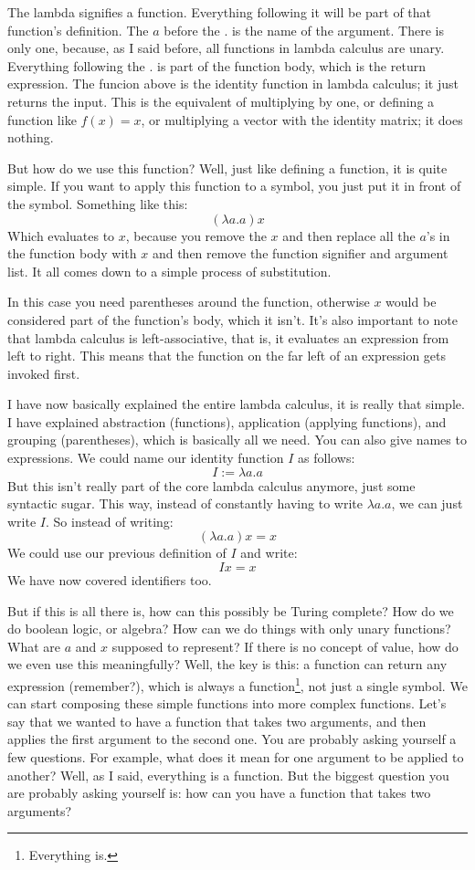 \documentclass[11pt]{article}
\begin{document}
The lambda signifies a function. Everything following it will be part of that
function's definition. The \(a\) before the \(.\) is the name of the argument.
There is only one, because, as I said before, all functions in lambda calculus
are unary. Everything following the \(.\) is part of the function body, which
is the return expression. The funcion above is the identity function in lambda
calculus; it just returns the input. This is the equivalent of multiplying by
one, or defining a function like \(f(x)=x\), or multiplying a vector with the
identity matrix; it does nothing.

But how do we use this function? Well, just like defining a function, it is
quite simple. If you want to apply this function to a symbol, you just put it
in front of the symbol. Something like this:
\[(\lambda a.a)x\]
Which evaluates to \(x\), because you remove the \(x\) and then replace all the
\(a\)'s in the function body with \(x\) and then remove the function signifier
and argument list. It all comes down to a simple process of substitution.

In this case you need parentheses around the function, otherwise \(x\) would be
considered part of the function's body, which it isn't. It's also important to
note that lambda calculus is left-associative, that is, it evaluates an
expression from left to right. This means that the function on the far left of
an expression gets invoked first.

I have now basically explained the entire lambda calculus, it is really that
simple. I have explained abstraction (functions), application (applying
functions), and grouping (parentheses), which is basically all we need. You
can also give names to expressions. We could name our identity function \(I\)
as follows: \[I:=\lambda a.a\] But this isn't really part of the core lambda
calculus anymore, just some syntactic sugar. This way, instead of constantly
having to write \(\lambda a.a\), we can just write \(I\). So instead of
writing: \[(\lambda a.a)x=x\] We could use our previous definition of \(I\) and
write: \[Ix=x\] We have now covered identifiers too.

But if this is all there is, how can this possibly be Turing complete? How do
we do boolean logic, or algebra? How can we do things with only unary
functions? What are \(a\) and \(x\) supposed to represent? If there is no
concept of value, how do we even use this meaningfully? Well, the key is this:
a function can return any expression (remember?), which is always a
function\footnote{Everything is.}, not just a single symbol. We can start
composing these simple functions into more complex functions. Let's say that we
wanted to have a function that takes two arguments, and then applies the first
argument to the second one. You are probably asking yourself a few questions.
For example, what does it mean for one argument to be applied to another? Well,
as I said, everything is a function. But the biggest question you are probably
asking yourself is: how can you have a function that takes two arguments?
\end{document}
